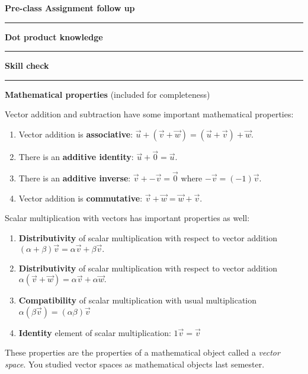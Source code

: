 \documentclass[12pt,letterpaper,noanswers]{exam}
\begin{document}
\noindent\textbf{Pre-class Assignment follow up}

\vspace{0.2cm}
\hrule
\vspace{0.2cm}

\noindent\textbf{Dot product knowledge}

\vspace{0.2cm}
\hrule
\vspace{0.2cm}

\noindent\textbf{Skill check}

\vspace{0.2cm}
\hrule
\vspace{0.2cm}



\noindent\textbf{Mathematical properties} (included for completeness)
\begin{tcolorbox}
Vector addition and subtraction have some important mathematical properties:
\begin{enumerate}
\itemsep0em
    \item Vector addition is \textbf{associative}: $\vec u + (\vec v + \vec w) = (\vec u + \vec v) + \vec w.$
    \item There is an \textbf{additive identity}: $\vec u + \vec 0 = \vec u.$
    \item There is an \textbf{additive inverse}: $\vec v + -\vec v = \vec 0$ where $-\vec v = (-1)\vec v.$
    \item Vector addition is \textbf{commutative}: $\vec v + \vec w = \vec w + \vec v$.
\end{enumerate}
Scalar multiplication with vectors has important properties as well:
\begin{enumerate}
\itemsep0em
    \item \textbf{Distributivity} of scalar multiplication with respect to vector addition $(\alpha + \beta)\vec v = \alpha\vec v + \beta \vec v.$
    \item \textbf{Distributivity} of scalar multiplication with respect to vector addition
    $\alpha(\vec v + \vec w) = \alpha\vec v + \alpha \vec w.$
    \item \textbf{Compatibility} of scalar multiplication with usual multiplication $\alpha(\beta\vec v) = (\alpha\beta)\vec v$
    \item \textbf{Identity} element of scalar multiplication: $1\vec v = \vec v$
\end{enumerate}
These properties are the properties of a mathematical object called a \emph{vector space}.  You studied vector spaces as mathematical objects last semester.
\end{tcolorbox}
\end{document}
